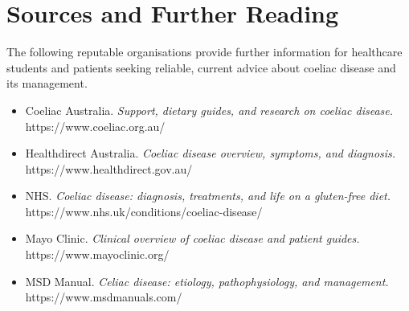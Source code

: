 \section*{Sources and Further Reading}
The following reputable organisations provide further information for healthcare students and patients seeking reliable, current advice about coeliac disease and its management.

\begin{itemize}
    \item Coeliac Australia. \textit{Support, dietary guides, and research on coeliac disease.} https://www.coeliac.org.au/
    \item Healthdirect Australia. \textit{Coeliac disease overview, symptoms, and diagnosis.} https://www.healthdirect.gov.au/
    \item NHS. \textit{Coeliac disease: diagnosis, treatments, and life on a gluten-free diet.} https://www.nhs.uk/conditions/coeliac-disease/
    \item Mayo Clinic. \textit{Clinical overview of coeliac disease and patient guides.} https://www.mayoclinic.org/
    \item MSD Manual. \textit{Celiac disease: etiology, pathophysiology, and management.} https://www.msdmanuals.com/
\end{itemize}
